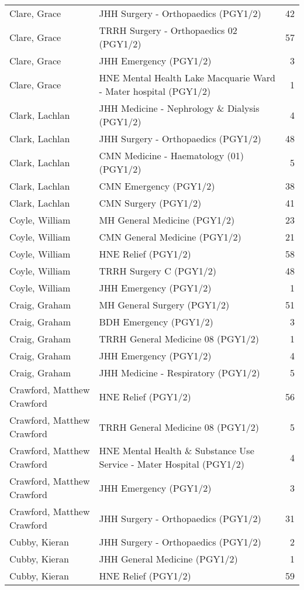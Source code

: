 \documentclass[
]{article}
\begin{document}
\begin{longtable}{llr}
Clare, Grace & JHH Surgery - Orthopaedics (PGY1/2) & 42 \\ 
Clare, Grace & TRRH Surgery - Orthopaedics 02 (PGY1/2) & 57 \\ 
Clare, Grace & JHH Emergency (PGY1/2) & 3 \\ 
Clare, Grace & HNE Mental Health Lake Macquarie Ward - Mater hospital (PGY1/2) & 1 \\ 
Clark, Lachlan & JHH Medicine - Nephrology \& Dialysis (PGY1/2) & 4 \\ 
Clark, Lachlan & JHH Surgery - Orthopaedics (PGY1/2) & 48 \\ 
Clark, Lachlan & CMN Medicine - Haematology (01) (PGY1/2) & 5 \\ 
Clark, Lachlan & CMN Emergency (PGY1/2) & 38 \\ 
Clark, Lachlan & CMN Surgery (PGY1/2) & 41 \\ 
Coyle, William & MH General Medicine (PGY1/2) & 23 \\ 
Coyle, William & CMN General Medicine (PGY1/2) & 21 \\ 
Coyle, William & HNE Relief (PGY1/2) & 58 \\ 
Coyle, William & TRRH Surgery C (PGY1/2) & 48 \\ 
Coyle, William & JHH Emergency (PGY1/2) & 1 \\ 
Craig, Graham & MH General Surgery (PGY1/2) & 51 \\ 
Craig, Graham & BDH Emergency (PGY1/2) & 3 \\ 
Craig, Graham & TRRH General Medicine 08 (PGY1/2) & 1 \\ 
Craig, Graham & JHH Emergency (PGY1/2) & 4 \\ 
Craig, Graham & JHH Medicine - Respiratory (PGY1/2) & 5 \\ 
Crawford, Matthew Crawford & HNE Relief (PGY1/2) & 56 \\ 
Crawford, Matthew Crawford & TRRH General Medicine 08 (PGY1/2) & 5 \\ 
Crawford, Matthew Crawford & HNE Mental Health \& Substance Use Service - Mater Hospital (PGY1/2) & 4 \\ 
Crawford, Matthew Crawford & JHH Emergency (PGY1/2) & 3 \\ 
Crawford, Matthew Crawford & JHH Surgery - Orthopaedics (PGY1/2) & 31 \\ 
Cubby, Kieran & JHH Surgery - Orthopaedics (PGY1/2) & 2 \\ 
Cubby, Kieran & JHH General Medicine (PGY1/2) & 1 \\ 
Cubby, Kieran & HNE Relief (PGY1/2) & 59 \\ 

\end{longtable}
\end{document}
